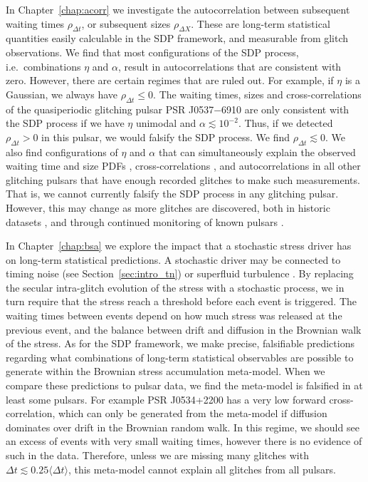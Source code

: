 In Chapter~\ref{chap:acorr} we investigate the autocorrelation between subsequent waiting times $\rho_{\Delta t}$, or subsequent sizes $\rho_{\Delta X}$. These are long-term statistical quantities easily calculable in the SDP framework, and measurable from glitch observations. We find that most configurations of the SDP process, i.e.~combinations $\eta$ and $\alpha$, result in autocorrelations that are consistent with zero. However, there are certain regimes that are ruled out. For example, if $\eta$ is a Gaussian, we always have $\rho_{\Delta t} \leq 0$. The waiting times, sizes and cross-correlations of the quasiperiodic glitching pulsar PSR J0537$-$6910 are only consistent with the SDP process if we have $\eta$ unimodal and $\alpha \lesssim 10^{-2}$. Thus, if we detected $\rho_{\Delta t} > 0$ in this pulsar, we would falsify the SDP process. We find $\rho_{\Delta t} \lesssim 0$. We also find configurations of $\eta$ and $\alpha$ that can simultaneously explain the observed waiting time and size PDFs \citep{Carlin2019quasi}, cross-correlations \citep{Melatos2018}, and autocorrelations \citep{Carlin2019ac} in all other glitching pulsars that have enough recorded glitches to make such measurements. That is, we cannot currently falsify the SDP process in any glitching pulsar. However, this may change as more glitches are discovered, both in historic datasets \citep{Basu2022,Dunn2022,Dunn2023}, and through continued monitoring of known pulsars \citep{Jankowski2019,Basu2020,Johnston2020,Amiri2021}. 

In Chapter~\ref{chap:bsa} we explore the impact that a stochastic stress driver has on long-term statistical predictions. A stochastic driver may be connected to timing noise (see Section~\ref{sec:intro_tn}) or superfluid turbulence \citep{Melatos2007,Melatos2014,Khomenko2019}. By replacing the secular intra-glitch evolution of the stress with a stochastic process, we in turn require that the stress reach a threshold before each event is triggered. The waiting times between events depend on how much stress was released at the previous event, and the balance between drift and diffusion in the Brownian walk of the stress. As for the SDP framework, we make precise, falsifiable predictions regarding what combinations of long-term statistical observables are possible to generate within the Brownian stress accumulation meta-model. When we compare these predictions to pulsar data, we find the meta-model is falsified in at least some pulsars. For example PSR J0534+2200 has a very low forward cross-correlation, which can only be generated from the meta-model if diffusion dominates over drift in the Brownian random walk. In this regime, we should see an excess of events with very small waiting times, however there is no evidence of such in the data. Therefore, unless we are missing many glitches with $\Delta t \lesssim 0.25 \langle \Delta t \rangle$, this meta-model cannot explain all glitches from all pulsars.


